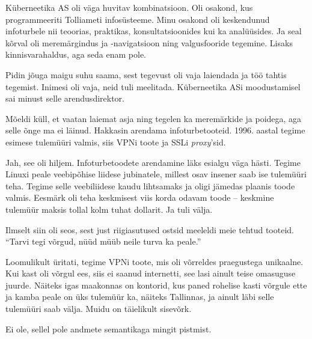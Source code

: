 Küberneetika AS oli väga 
huvitav kombinatsioon. Oli osakond, kus programmeeriti Tolliameti 
infosüsteeme. Minu osakond oli keskendunud infoturbele nii teoorias, 
praktikas, konsultatsioonides kui ka analüüsides. Ja seal kõrval oli 
meremärgindus ja -navigatsioon ning valgusfooride tegemine. Lisaks
kinnisvarahaldus, aga seda enam pole. 
 

Pidin jõuga maigu suhu saama, sest tegevust oli vaja laiendada ja 
töö tahtis tegemist. Inimesi oli vaja, neid tuli meelitada. 
Küberneetika ASi moodustamisel sai minust selle
arendusdirektor. 

Mõeldi küll, et vaatan laiemat asja ning tegelen ka meremärkide 
ja poidega, aga selle õnge ma ei läinud. Hakkasin arendama infoturbetooteid. 1996. aastal tegime esimese tulemüüri valmis, siis 
VPNi toote ja SSLi \emph{proxy}'sid. 


Jah, see oli hiljem. Infoturbetoodete arendamine läks esialgu väga
hästi. Tegime Linuxi peale veebipõhise liidese 
jubinatele, millest osav insener saab ise tulemüüri teha. Tegime selle veebiliidese kaudu lihtsamaks ja oligi jämedas plaanis 
toode valmis. Eesmärk oli teha keskmisest viis korda odavam toode -- keskmine 
tulemüür maksis tollal kolm tuhat dollarit. Ja tuli välja. 

Ilmselt siin oli seos, sest just 
riigiasutused ostsid meeleldi meie tehtud tooteid. \enquote{Tarvi 
tegi võrgud, nüüd müüb neile turva ka peale.}


Loomulikult üritati, tegime 
VPNi toote, mis oli võrreldes praegustega unikaalne. Kui kast 
oli võrgul ees, siis ei saanud internetti, see lasi ainult teise omasuguse juurde. 
Näiteks igas maakonnas on kontorid, kus paned rohelise kasti võrgule ette ja kamba peale on üks tulemüür ka, näiteks Tallinnas, ja ainult läbi selle tulemüüri saab 
välja. Muidu on täielikult sisevõrk. 


Ei ole, sellel pole andmete semantikaga mingit pistmist. 

